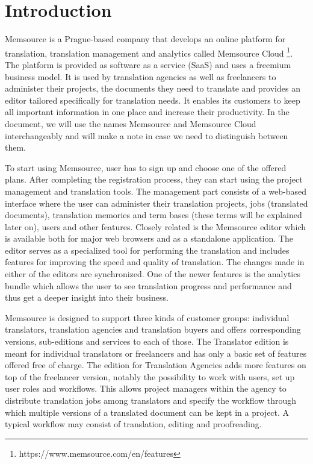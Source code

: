 
\chapter{Introduction}


Memsource is a Prague-based company that develops an online platform for translation, translation management and analytics called Memsource Cloud \footnote{https://www.memsource.com/en/features}. The platform is provided as software as a service (SaaS) and uses a freemium business model. It is used by translation agencies as well as freelancers to administer their projects, the documents they need to translate and provides an editor tailored specifically for translation needs. It enables its customers to keep all important information in one place and increase their productivity. In the document, we will use the names Memsource and Memsource Cloud interchangeably and will make a note in case we need to distinguish between them.

To start using Memsource, user has to sign up and choose one of the offered plans. After completing the registration process, they can start using the project management and translation tools. The management part consists of a web-based interface where the user can administer their translation projects, jobs (translated documents), translation memories and term bases (these terms will be explained later on), users and other features. Closely related is the Memsource editor which is available both for major web browsers and as a standalone application. The editor serves as a specialized tool for performing the translation and includes features for improving the speed and quality of translation. The changes made in either of the editors are synchronized. One of the newer features is the analytics bundle which allows the user to see translation progress and performance and thus get a deeper insight into their business.

Memsource is designed to support three kinds of customer groups: individual translators, translation agencies and translation buyers and offers corresponding versions, sub-editions and services to each of those.
The Translator edition is meant for individual translators or freelancers and has only a basic set of features offered free of charge. The edition for Translation Agencies adds more features on top of the freelancer version, notably the possibility to work with users, set up user roles and workflows. This allows project managers within the agency to distribute translation jobs among translators and specify the workflow through which multiple versions of a translated document can be kept in a project. A typical workflow may consist of translation, editing and proofreading.

